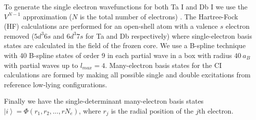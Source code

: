\documentclass[8pt,a4paper, twoside]{report}
\begin{document}
To generate the single electron wavefunctions for both Ta I and Db I  we use the $V^{N-1}$ approximation ($N$ is the total number of electrons) \cite{Kelly1964, Dzuba2005}. The Hartree-Fock (HF) calculations are performed for an open-shell atom with a valence $s$ electron removed ($5d^3 6s$ and $6d^3 7s$ for Ta  and Db respectively) where  single-electron basis states are calculated in the field of the frozen core. We use a  B-spline technique~\cite{Johnson1988}  with 40 B-spline states of order 9 in each partial wave in a box with radius $40 \ a_B$ with partial waves up to $l_{max}=4$. Many-electron basis states for the CI calculations are formed by making all possible single and double excitations from reference low-lying configurations. 


Finally we have the single-determinant many-electron basis states $\left|i\right> = \Phi\left(r_1, r_2, ... , r{N_e}\right)$, where $r_j$ is the radial position of the $j$th electron.
\end{document}
